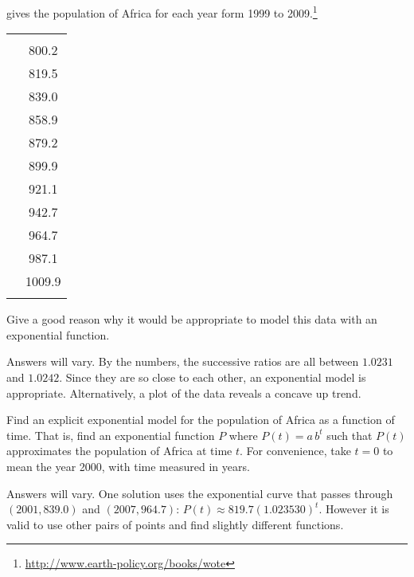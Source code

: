 \begin{problem}
 gives the population of Africa for each year form 1999 to 2009.\footnote{\href{http://www.earth-policy.org/books/wote}{http://www.earth-policy.org/books/wote}}
			
\begin{table}[!htb]
	\centering
	\label{exp:tab:AfricaPopulation}
	\begin{tabular}{S[table-format=4.0]S[table-format=3.1]}
		\beforeheading
		 &  \\
		           & 800.2              \\           & 819.5              \\           & 839.0              \\           & 858.9              \\           & 879.2              \\           & 899.9              \\           & 921.1              \\           & 942.7              \\           & 964.7              \\           & 987.1              \\           & 1009.9             \\\lastline
	\end{tabular}
\end{table}
			
\begin{subproblem}
	Give a good reason why it would be appropriate to model this data with an exponential function.
	\begin{shortsolution}
		Answers will vary.  By the numbers, the successive ratios 
		are all between $1.0231$ and $1.0242$.  Since they are so close to each other, 
		an exponential model is appropriate.  Alternatively, a plot of the data reveals a concave up trend.
	\end{shortsolution}
\end{subproblem}
\begin{subproblem}\label{exp:prob:Africamodel}
	Find an explicit exponential model for the population of Africa as a function of time.  
	That is, find an exponential function $P$ where $P(t)=a\,b^t$ such that $P(t)$ approximates the 
	population of Africa at time $t$.  For convenience, take $t=0$ to mean the year 2000, with time measured in years.
	\begin{shortsolution}
		Answers will vary.  One solution uses the exponential curve that passes through $(2001,839.0)$ and $(2007,964.7)$: $P(t)\approx819.7(1.023530)^t$.  However it is valid to use other pairs of points and find slightly different functions.
																			

\end{shortsolution}
\end{subproblem}
\end{problem}
